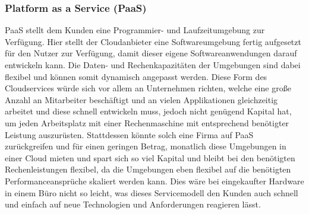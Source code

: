 
\subsubsection{Platform as a Service (PaaS)}
PaaS stellt dem Kunden eine Programmier- und Laufzeitumgebung zur Verfügung. Hier stellt der Cloudanbieter eine Softwareumgebung fertig aufgesetzt für den Nutzer zur Verfügung, damit dieser eigene Softwareanwendungen darauf entwickeln kann. Die Daten- und Rechenkapazitäten der Umgebungen sind dabei flexibel und können somit dynamisch angepasst werden.\newline
\newline
Diese Form des Cloudservices würde sich vor allem an Unternehmen richten, welche eine große Anzahl an Mitarbeiter beschäftigt und an vielen Applikationen gleichzeitig arbeitet und diese schnell entwickeln muss, jedoch nicht genügend Kapital hat, um jeden Arbeitsplatz mit einer Rechenmaschine mit entsprechend benötigter Leistung auszurüsten. Stattdessen könnte solch eine Firma auf PaaS zurückgreifen und für einen geringen Betrag, monatlich diese Umgebungen in einer Cloud mieten und spart sich so viel Kapital und bleibt bei den benötigten Rechenleistungen flexibel, da die Umgebungen eben flexibel auf die benötigten Performanceansprüche skaliert werden kann. Dies wäre bei eingekaufter Hardware in einem Büro nicht so leicht, was dieses Servicemodell den Kunden auch schnell und einfach auf neue Technologien und Anforderungen reagieren lässt.



